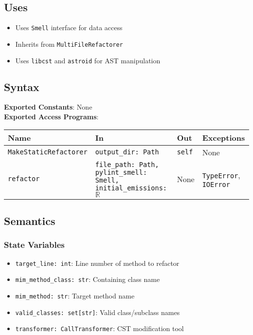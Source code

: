 \documentclass[12pt, titlepage]{article}
\begin{document}
\subsection{Uses}
\begin{itemize}
\item Uses \texttt{Smell} interface for data access
\item Inherits from \texttt{MultiFileRefactorer}
\item Uses \texttt{libcst} and \texttt{astroid} for AST manipulation
\end{itemize}

\subsection{Syntax}
\noindent
\textbf{Exported Constants}: None \\

\noindent
\textbf{Exported Access Programs}: \\
\begin{tabularx}{\linewidth}{|l|>{\raggedright\arraybackslash}X|l|l|}
  \hline
  \textbf{Name} & \textbf{In} & \textbf{Out} & \textbf{Exceptions} \\
  \hline
  \texttt{MakeStaticRefactorer} & \texttt{output\_dir: Path} & \texttt{self} & None \\
  \hline
  \texttt{refactor} & \texttt{file\_path: Path, pylint\_smell: Smell, initial\_emissions: $\mathbb{R}$} & None & \texttt{TypeError}, \texttt{IOError} \\
  \hline
\end{tabularx}

\subsection{Semantics}

\subsubsection{State Variables}
\begin{itemize}
\item \texttt{target\_line: int}: Line number of method to refactor
\item \texttt{mim\_method\_class: str}: Containing class name
\item \texttt{mim\_method: str}: Target method name
\item \texttt{valid\_classes: set[str]}: Valid class/subclass names
\item \texttt{transformer: CallTransformer}: CST modification tool
\end{itemize}
\end{document}
